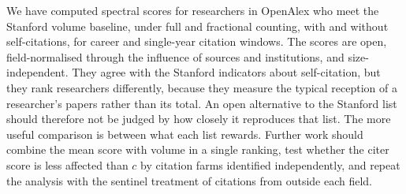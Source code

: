 We have computed spectral scores for \NOaEligible{} researchers in OpenAlex who meet the Stanford volume baseline, under full and fractional counting, with and without self-citations, for career and single-year citation windows. The scores are open, field-normalised through the influence of sources and institutions, and size-independent. They agree with the Stanford indicators about self-citation, but they rank researchers differently, because they measure the typical reception of a researcher's papers rather than its total. An open alternative to the Stanford list should therefore not be judged by how closely it reproduces that list. The more useful comparison is between what each list rewards. Further work should combine the mean score with volume in a single ranking, test whether the citer score is less affected than $c$ by citation farms identified independently, and repeat the analysis with the sentinel treatment of citations from outside each field.
